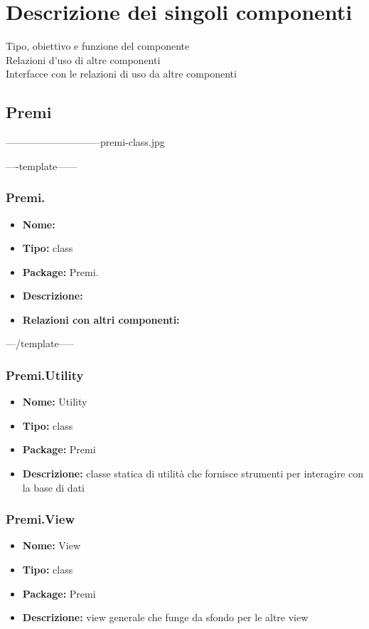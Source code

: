 \section{Descrizione dei singoli componenti}
	Tipo, obiettivo e funzione del componente \\
	Relazioni d'uso di altre componenti \\
	Interfacce con le relazioni di uso da altre componenti \\
\subsection{Premi}
-----------------------------premi-class.jpg

----template------
\subsubsection{Premi.}
\begin{itemize}
  \item \textbf{Nome:}
  \item \textbf{Tipo:} class
  \item \textbf{Package:} Premi.
  \item \textbf{Descrizione:}
  \item \textbf{Relazioni con altri componenti:} 
\end{itemize}
---/template-----


\subsubsection{Premi.Utility}
\begin{itemize}
  \item[] \textbf{Nome:} Utility
  \item[] \textbf{Tipo:} class
  \item[] \textbf{Package:} Premi
  \item[] \textbf{Descrizione:} classe statica di utilità che fornisce strumenti per interagire con la base di dati
\end{itemize}

\subsubsection{Premi.View}
\begin{itemize}
  \item \textbf{Nome:} View
  \item \textbf{Tipo:} class
  \item \textbf{Package:} Premi
  \item \textbf{Descrizione:} view generale che funge da sfondo per le altre view
\end{itemize}

